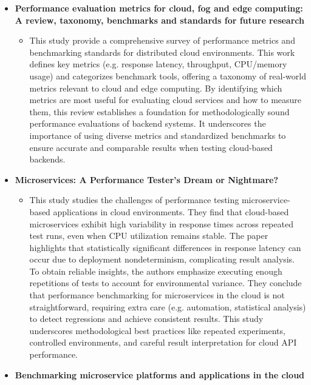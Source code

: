 \documentclass[11pt]{article}
\begin{document}
\begin{itemize}
    \item[] \textbf{Performance evaluation metrics for cloud, fog and edge computing: A review, taxonomy, benchmarks and standards for future research}
    \begin{itemize}
        \item[] This study provide a comprehensive survey of performance metrics and benchmarking standards for distributed cloud environments. This work defines key metrics (e.g. response latency, throughput, CPU/memory usage) and categorizes benchmark tools, offering a taxonomy of real-world metrics relevant to cloud and edge computing. By identifying which metrics are most useful for evaluating cloud services and how to measure them, this review establishes a foundation for methodologically sound performance evaluations of backend systems. It underscores the importance of using diverse metrics and standardized benchmarks to ensure accurate and comparable results when testing cloud-based backends.
    \end{itemize}
    \item[] \textbf{Microservices: A Performance Tester’s Dream or Nightmare?}
    \begin{itemize}
        \item[] This study studies the challenges of performance testing microservice-based applications in cloud environments. They find that cloud-based microservices exhibit high variability in response times across repeated test runs, even when CPU utilization remains stable. The paper highlights that statistically significant differences in response latency can occur due to deployment nondeterminism, complicating result analysis. To obtain reliable insights, the authors emphasize executing enough repetitions of tests to account for environmental variance. They conclude that performance benchmarking for microservices in the cloud is not straightforward, requiring extra care (e.g. automation, statistical analysis) to detect regressions and achieve consistent results. This study underscores methodological best practices like repeated experiments, controlled environments, and careful result interpretation for cloud API performance.
    \end{itemize}
    \item[] \textbf{Benchmarking microservice platforms and applications in the cloud}
    \begin{itemize}

\end{itemize}
\end{itemize}
\end{document}
